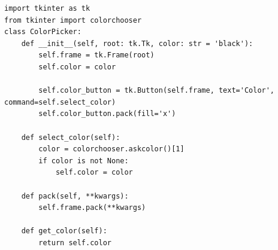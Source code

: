 \begin{tcolorbox}[title={\textbf{\small Generated code (color\_picker.py)}}, 
colback=whitesmoke, colframe=royalblue(web), boxrule=2pt, arc=0mm]
{\scriptsize
\begin{lstlisting}[style=mystyle]
import tkinter as tk
from tkinter import colorchooser
class ColorPicker:
    def __init__(self, root: tk.Tk, color: str = 'black'):
        self.frame = tk.Frame(root)
        self.color = color

        self.color_button = tk.Button(self.frame, text='Color', command=self.select_color)
        self.color_button.pack(fill='x')

    def select_color(self):
        color = colorchooser.askcolor()[1]
        if color is not None:
            self.color = color

    def pack(self, **kwargs):
        self.frame.pack(**kwargs)

    def get_color(self):
        return self.color
\end{lstlisting}
}
\end{tcolorbox}

